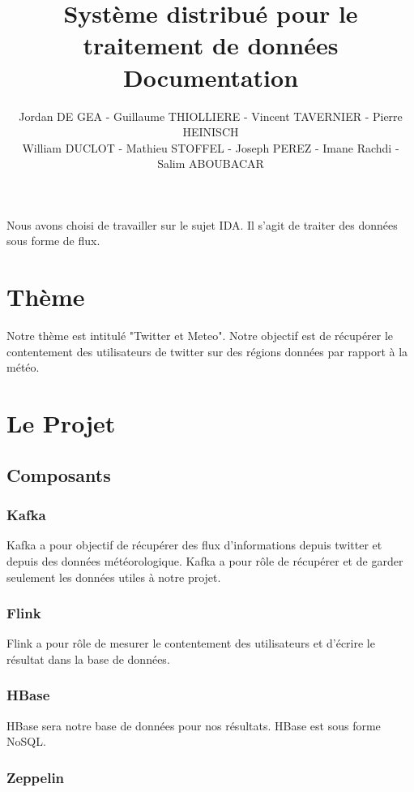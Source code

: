 \documentclass[a4paper,oneside,10pt]{article}
\title{Système distribué pour le traitement de données\\
Documentation
}
\author{Jordan DE GEA - Guillaume THIOLLIERE - Vincent TAVERNIER - Pierre HEINISCH\\
William DUCLOT - Mathieu STOFFEL - Joseph PEREZ - Imane Rachdi - Salim ABOUBACAR}
\begin{document}
\maketitle

Nous avons choisi de travailler sur le sujet IDA. Il s'agit de traiter des données sous forme de flux. \\

\section{Thème} 

Notre thème est intitulé "Twitter et Meteo". Notre objectif est de récupérer le contentement des utilisateurs de twitter sur des régions données par rapport à la météo. 

\section{Le Projet}

\subsection{Composants}

\subsubsection{Kafka}

Kafka a pour objectif de récupérer des flux d'informations depuis twitter et depuis des données météorologique. Kafka a pour rôle de récupérer et de garder seulement les données utiles à notre projet. 

\subsubsection{Flink}

Flink a pour rôle de mesurer le contentement des utilisateurs et d'écrire le résultat dans la base de données. 

\subsubsection{HBase}

HBase sera notre base de données pour nos résultats. HBase est sous forme NoSQL. 

\subsubsection{Zeppelin}
\end{document}

